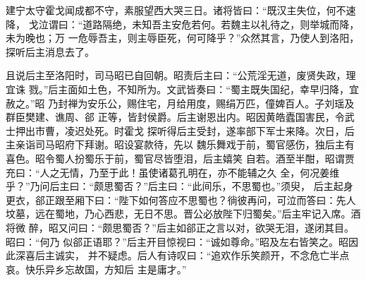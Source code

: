 建宁太守霍戈闻成都不守，素服望西大哭三日。诸将皆曰：“既汉主失位，何不速降，
戈泣谓曰：“道路隔绝，未知吾主安危若何。若魏主以礼待之，则举城而降，未为晚也；万
一危辱吾主，则主辱臣死，何可降乎？”众然其言，乃使人到洛阳，探听后主消息去了。

且说后主至洛阳时，司马昭已自回朝。昭责后主曰：“公荒淫无道，废贤失政，理宜诛
戮。”后主面如土色，不知所为。文武皆奏曰：“蜀主既失国纪，幸早归降，宜赦之。”昭
乃封禅为安乐公，赐住宅，月给用度，赐绢万匹，僮婢百人。子刘瑶及群臣樊建、谯周、郤
正等，皆封侯爵。后主谢恩出内。昭因黄皓蠹国害民，令武士押出市曹，凌迟处死。时霍戈
探听得后主受封，遂率部下军士来降。次日，后主亲诣司马昭府下拜谢。昭设宴款待，先以
魏乐舞戏于前，蜀官感伤，独后主有喜色。昭令蜀人扮蜀乐于前，蜀官尽皆堕泪，后主嬉笑
自若。酒至半酣，昭谓贾充曰：“人之无情，乃至于此！虽使诸葛孔明在，亦不能辅之久
全，何况姜维乎？”乃问后主曰：“颇思蜀否？”后主曰：“此间乐，不思蜀也。”须臾，
后主起身更衣，郤正跟至厢下曰：“陛下如何答应不思蜀也？徜彼再问，可泣而答曰：先人
坟墓，远在蜀地，乃心西悲，无日不思。晋公必放陛下归蜀矣。”后主牢记入席。酒将微
醉，昭又问曰：“颇思蜀否？”后主如郤正之言以对，欲哭无泪，遂闭其目。昭曰：“何乃
似郤正语耶？”后主开目惊视曰：“诚如尊命。”昭及左右皆笑之。昭因此深喜后主诚实，
并不疑虑。后人有诗叹曰：“追欢作乐笑颜开，不念危亡半点哀。快乐异乡忘故国，方知后
主是庸才。”


